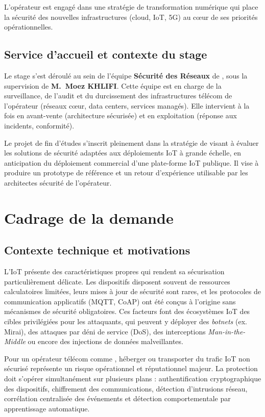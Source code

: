L'opérateur est engagé dans une stratégie de transformation numérique qui place la sécurité des nouvelles infrastructures (cloud, IoT, 5G) au cœur de ses priorités opérationnelles.

\subsection{Service d'accueil et contexte du stage}

Le stage s'est déroulé au sein de l'équipe \textbf{Sécurité des Réseaux} de \TT{}, sous la supervision de \textbf{M.~Moez KHLIFI}. Cette équipe est en charge de la surveillance, de l'audit et du durcissement des infrastructures télécom de l'opérateur (réseaux cœur, data centers, services managés). Elle intervient à la fois en avant-vente (architecture sécurisée) et en exploitation (réponse aux incidents, conformité).

Le projet de fin d'études s'inscrit pleinement dans la stratégie de \TT{} visant à évaluer les solutions de sécurité adaptées aux déploiements IoT à grande échelle, en anticipation du déploiement commercial d'une plate-forme IoT publique. Il vise à produire un prototype de référence et un retour d'expérience utilisable par les architectes sécurité de l'opérateur.

\section{Cadrage de la demande}

\subsection{Contexte technique et motivations}

L'IoT présente des caractéristiques propres qui rendent sa sécurisation particulièrement délicate. Les dispositifs disposent souvent de ressources calculatoires limitées, leurs mises à jour de sécurité sont rares, et les protocoles de communication applicatifs (MQTT, CoAP) ont été conçus à l'origine sans mécanismes de sécurité obligatoires. Ces facteurs font des écosystèmes IoT des cibles privilégiées pour les attaquants, qui peuvent y déployer des \textit{botnets} (ex. Mirai), des attaques par déni de service (\ac{DoS}), des interceptions \textit{Man-in-the-Middle} ou encore des injections de données malveillantes.

Pour un opérateur télécom comme \TT{}, héberger ou transporter du trafic IoT non sécurisé représente un risque opérationnel et réputationnel majeur. La protection doit s'opérer simultanément sur plusieurs plans : authentification cryptographique des dispositifs, chiffrement des communications, détection d'intrusions réseau, corrélation centralisée des événements et détection comportementale par apprentissage automatique.

